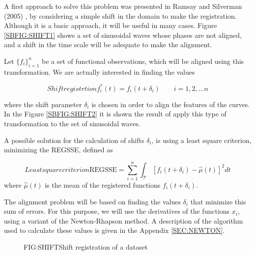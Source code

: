 
A first approach to solve this problem was presented in Ramsay and Silverman
(2005) \cite{Ramsay2005}, by considering a simple shift in the domain to make the
registration. Although it is a basic approach, it will be useful in many cases.
Figure \ref{SBFIG:SHIFT1} shows a set of sinusoidal waves whose phases are not
aligned, and a shift in the time scale will be adequate to make the alignment.

Let $\{f_i\}_{i=1}^n$ be a set of functional observations, which will be aligned
using this transformation. We are actually interested in finding the values

\begin{equation}[EQN:SHIFTS]{Shift registrtion}
f_i^*(t)=f_i(t+ \delta_i) \qquad i=1,2, \dots n
\end{equation}

where the shift parameter $\delta_i$ is chosen in order to align the features of
the curves. In the Figure \ref{SBFIG:SHIFT2} it is shown the result of apply
this type of transformation to the set of sinusoidal waves.


A possible solution for the calculation of shifts $\delta_i$, is using a least
square criterion, minimizing the  \ac{REGSSE}, defined as

\begin{equation}[EQ:REGSSE]{Least square criterion}
\text{REGSSE} = \sum_{i=1}^{n}\int_{\mathcal{T}}\left [f_i(t+\delta_i) - \hat \mu(t) \right ]^2 dt
\end{equation}
where $\hat \mu(t)$ is the mean of the registered functions $f_i(t+\delta_i)$.

The alignment problem will be based on finding the values $\delta_i$ that
minimize this sum of errors. For this purpose,
we will use the derivatives of the functions $x_i$, using a variant of the
Newton-Rhapson method. A description of the algorithm used to calculate these
values is given in the Appendix \ref{SEC:NEWTON}.

\begin{figure}[Shift registration of a dataset]{FIG:SHIFT}{Shift registration of a dataset}
	 \quad
\end{figure}
